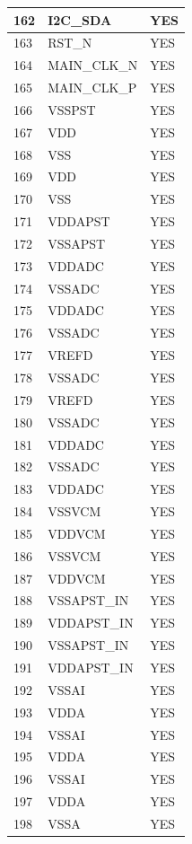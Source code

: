 \documentclass{lhcbnote}
\begin{document}
\begin{longtable}{ | l | l | l | }
	162 & I2C\_SDA & YES \\ \hline
	163 & RST\_N & YES \\ \hline
	164 & MAIN\_CLK\_N & YES \\ \hline
	165 & MAIN\_CLK\_P & YES \\ \hline
	166 & VSSPST & YES \\ \hline
	167 & VDD & YES \\ \hline
	168 & VSS & YES \\ \hline
	169 & VDD & YES \\ \hline
	170 & VSS & YES \\ \hline
	171 & VDDAPST & YES \\ \hline
	172 & VSSAPST & YES \\ \hline
	173 & VDDADC & YES \\ \hline
	174 & VSSADC & YES \\ \hline
	175 & VDDADC & YES \\ \hline
	176 & VSSADC & YES \\ \hline
	177 & VREFD & YES \\ \hline
	178 & VSSADC & YES \\ \hline
	179 & VREFD & YES \\ \hline
	180 & VSSADC & YES \\ \hline
	181 & VDDADC & YES \\ \hline
	182 & VSSADC & YES \\ \hline
	183 & VDDADC & YES \\ \hline
	184 & VSSVCM & YES \\ \hline
	185 & VDDVCM & YES \\ \hline
	186 & VSSVCM & YES \\ \hline
	187 & VDDVCM & YES \\ \hline
	188 & VSSAPST\_IN & YES \\ \hline
	189 & VDDAPST\_IN & YES \\ \hline
	190 & VSSAPST\_IN & YES \\ \hline
	191 & VDDAPST\_IN & YES \\ \hline
	192 & VSSAI & YES \\ \hline
	193 & VDDA & YES \\ \hline
	194 & VSSAI & YES \\ \hline
	195 & VDDA & YES \\ \hline
	196 & VSSAI & YES \\ \hline
	197 & VDDA & YES \\ \hline
	198 & VSSA & YES \\ \hline

\end{longtable}
\end{document}
